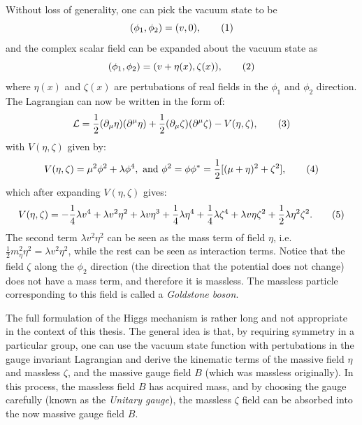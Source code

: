 Without loss of generality, one can pick the vacuum state to be 
\[
(\phi_1, \phi_2)     =  (v, 0), 
\addtag \]
and the complex scalar field can be expanded about the vacuum state as
\[ 
    (\phi_1, \phi_2)     =  (v + \eta(x), \zeta(x)),    
\addtag \]
where $\eta(x)$ and $\zeta(x)$ are pertubations of real fields in the 
$\phi_1$ and $\phi_2$ direction. 
The Lagrangian can now be written in the form of:
\[
\mathcal{L}    =  \frac{1}{2}(\partial_\mu \eta)(\partial^\mu \eta)
+ \frac{1}{2}(\partial_\mu \zeta)(\partial^\mu \zeta)
- V(\eta, \zeta),
\addtag \]
with $V(\eta, \zeta)$ given by:
\[
    V(\eta, \zeta) = \mu^2 \phi^2  + \lambda \phi^4,\ \text{and}\ 
    \phi^2 =\phi\phi^* = \frac{1}{2}[(\mu + \eta)^2 + \zeta^2],
\addtag \]
which after expanding $V(\eta, \zeta)$ gives:
\[
    V(\eta, \zeta) = 
    -\frac{1}{4} \lambda v^4 + \lambda v^2\eta^2 + \lambda v\eta^3
    +\frac{1}{4} \lambda\eta^4 +\frac{1}{4} \lambda\zeta^4
    + \lambda v\eta\zeta^2 + \frac{1}{2} \lambda\eta^2\zeta^2.
\addtag \]
The second term $ \lambda v^2\eta^2$ can be seen as the mass term of field $\eta$,
i.e.\ $\frac{1}{2} m_\eta^2\eta^2 = \lambda v^2\eta^2$,
while the rest can be seen as interaction terms. 
Notice that the field $\zeta$ along the $\phi_2$ direction (the direction 
that the potential does not change) does not have a mass term, 
and therefore it is massless. The massless particle corresponding to this
field is called a \textit{Goldstone boson}.

The full formulation of the Higgs mechanism is rather long and 
not appropriate in the context of this thesis. The general idea is that, 
by requiring symmetry in a particular group, one can use the vacuum state function
with pertubations in the gauge invariant Lagrangian and derive the kinematic terms of 
the massive field $\eta$ and massless $\zeta$, and the massive gauge field $B$ (which was
massless originally). In this process, the massless field $B$ has acquired mass,
and by choosing the gauge carefully (known as 
the \textit{Unitary gauge}), the massless $\zeta$ field can be absorbed 
into the now massive gauge field $B$.

